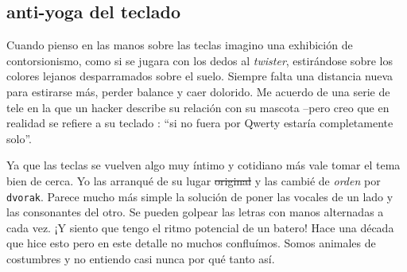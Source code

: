 \subsection*{anti-yoga del teclado}

Cuando pienso en las manos sobre las teclas imagino una exhibición de
contorsionismo, como si se jugara con los dedos al \textit{twister}, estirándose
sobre los colores lejanos desparramados sobre el suelo. Siempre falta
una distancia nueva para estirarse más, perder balance y caer dolorido.
Me acuerdo de una serie de tele en la que un hacker describe su relación
con su mascota --pero creo que en realidad se refiere a su teclado%
: ``si no fuera por Qwerty estaría completamente solo''.
\smallskip

Ya que las teclas se vuelven algo muy íntimo y cotidiano más vale tomar
el tema bien de cerca. Yo las arranqué de su lugar \sout{original} y las cambié de %
\textit{orden}
por \texttt{dvorak}. Parece mucho más simple la
solución de poner las vocales de un lado y las consonantes del otro.
Se pueden
golpear las letras con manos alternadas a cada vez. ¡Y siento que
tengo el ritmo potencial de un batero! Hace una década que hice esto
pero en este detalle no muchos confluímos. Somos animales de costumbres
y no entiendo casi nunca por qué tanto así. %

\cleardoublepage
